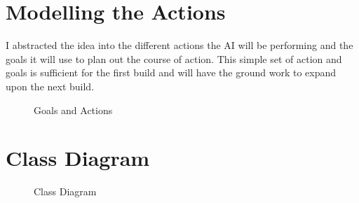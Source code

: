 \documentclass[12pt]{report}
\begin{document}
\section{Modelling the Actions}
I abstracted the idea into the different actions the AI will be performing and the goals it will use to plan out the course of action. This simple set of action and goals is sufficient for the first build and will have the ground work to expand upon the next build.

\begin{figure}[H]
    \centering
    \caption{Goals and Actions}
\end{figure}

\section{Class Diagram}

\begin{figure}[H]
    \centering
    \caption{Class Diagram}
\end{figure}
\end{document}
